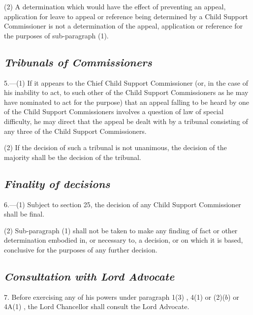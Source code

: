 \documentclass[12pt,a4paper]{article}
\begin{document}
(2) A determination which would have the effect of preventing an appeal, application for leave to appeal or reference being determined by a Child Support Commissioner is not a determination of the appeal, application or reference for the purposes of sub-paragraph (1).


\subsection*{\itshape Tribunals of Commissioners}

5.---(1) If it appears to the Chief Child Support Commissioner (or, in the case of his inability to act, to such other of the Child Support Commissioners as he may have nominated to act for the purpose) that an appeal falling to be heard by one of the Child Support Commissioners involves a question of law of special difficulty, he may direct that the appeal be dealt with by a tribunal consisting of any three of the Child Support Commissioners.

(2) If the decision of such a tribunal is not unanimous, the decision of the majority shall be the decision of the tribunal.

\subsection*{\itshape Finality of decisions}

6.---(1) Subject to section 25, the decision of any Child Support Commissioner shall be final.

(2) Sub-paragraph (1)  shall not be taken to make any finding of fact or other determination embodied in, or necessary to, a decision, or on which it is based, conclusive for the purposes of any further decision.

\subsection*{\itshape Consultation with Lord Advocate}

7. Before exercising any of his powers under 
paragraph 1(3)%
, 
4(1) or (2)($b$) or 4A(1)%
, the Lord Chancellor shall consult the Lord Advocate.

\end{document}
